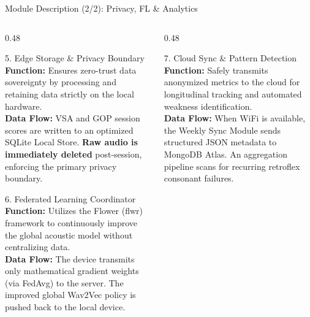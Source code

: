 \documentclass[aspectratio=169, 11pt, xcolor=table]{beamer}
\begin{document}
\begin{frame}{Module Description (2/2): Privacy, FL \& Analytics}
    \vspace{-4mm}
    \begin{columns}[T, totalwidth=\textwidth]

        \begin{column}{0.48\textwidth}
            \begin{block}{5. Edge Storage \& Privacy Boundary}
                \tiny
                \textbf{Function:} Ensures zero-trust data sovereignty by processing and retaining data strictly on the local hardware. \\
                \textbf{Data Flow:} VSA and GOP session scores are written to an optimized SQLite Local Store. \textbf{Raw audio is immediately deleted} post-session, enforcing the primary privacy boundary.
            \end{block}

            \vspace{1mm}
            \begin{block}{6. Federated Learning Coordinator}
                \tiny
                \textbf{Function:} Utilizes the Flower (flwr) framework to continuously improve the global acoustic model without centralizing data. \\
                \textbf{Data Flow:} The device transmits only mathematical gradient weights (via FedAvg) to the server. The improved global Wav2Vec policy is pushed back to the local device.
            \end{block}
        \end{column}

        \begin{column}{0.48\textwidth}
            \begin{block}{7. Cloud Sync \& Pattern Detection}
                \tiny
                \textbf{Function:} Safely transmits anonymized metrics to the cloud for longitudinal tracking and automated weakness identification. \\
                \textbf{Data Flow:} When WiFi is available, the Weekly Sync Module sends structured JSON metadata to MongoDB Atlas. An aggregation pipeline scans for recurring retroflex consonant failures.
            \end{block}


\end{column}
\end{columns}
\end{frame}
\end{document}
